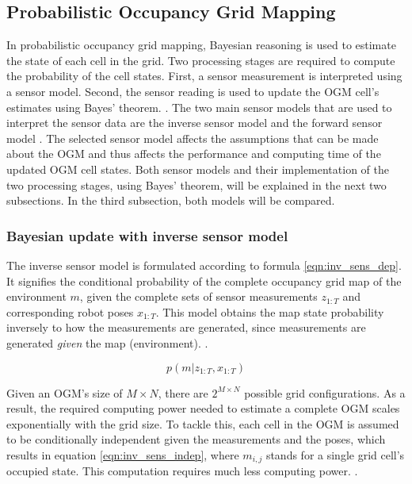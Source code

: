 

\subsection{Probabilistic Occupancy Grid Mapping} \label{subsec:prob_OGM}
In probabilistic occupancy grid mapping, Bayesian reasoning is used to estimate the state of each cell in the grid. Two processing stages are required to compute the probability of the cell states. First, a sensor measurement is interpreted using a sensor model. Second, the sensor reading is used to update the \gls{OGM} cell's estimates using Bayes' theorem. \cite{elfes1990occupancy} \cite{moras2014evidential}. The two main sensor models that are used to interpret the sensor data are the inverse sensor model \cite{elfes1990occupancy} and the forward sensor model \cite{thrun2003learning}. The selected sensor model affects the assumptions that can be made about the \gls{OGM} and thus affects the performance and computing time of the updated \gls{OGM} cell states. Both sensor models and their implementation of the two processing stages, using Bayes' theorem, will be explained in the next two subsections. In the third subsection, both models will be compared. 

\subsubsection{Bayesian update with inverse sensor model}
The inverse sensor model is formulated according to formula \ref{eqn:inv_sens_dep}. It signifies the conditional probability of the complete occupancy grid map of the environment $m$, given the complete sets of sensor measurements $z_{1:T}$ and corresponding robot poses $x_{1:T}$. This model obtains the map state probability inversely to how the measurements are generated, since measurements are generated \textit{given} the map (environment). \cite{carvalho2013comparative}. 

\begin{equation} \label{eqn:inv_sens_dep}
	p(m|z_{1:T},x_{1:T})
\end{equation}

Given an \gls{OGM}'s size of $M\times N$, there are $2^{M\times N}$ possible grid configurations. As a result, the required computing power needed to estimate a complete \gls{OGM} scales exponentially with the grid size. To tackle this, each cell in the \gls{OGM} is assumed to be conditionally independent given the measurements and the poses, which results in equation \ref{eqn:inv_sens_indep}, where $m_{i,j}$ stands for a single grid cell's occupied state. This computation requires much less computing power. \cite{UoP2021} \cite{carvalho2013comparative}.

